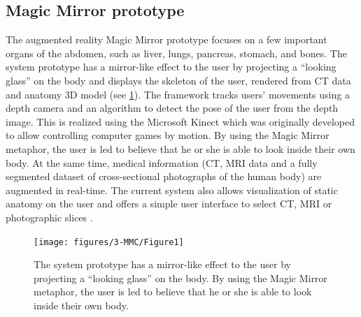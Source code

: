 \subsection{Magic Mirror prototype}
The augmented reality Magic Mirror prototype focuses on a few important organs of the abdomen, such as liver, lungs, pancreas, stomach, and bones.  
The system prototype has a mirror-like effect to the user by projecting a ``looking glass'' on the body and displays the skeleton of the user, rendered from CT data and anatomy 3D model (see \figurename{\ref{fig:3-MMC:Prototype}}). 
The framework tracks users' movements using a depth camera and an algorithm to detect the pose of the user from the depth image. This is realized using the Microsoft Kinect which was originally developed to allow controlling computer games by motion. 
By using the Magic Mirror metaphor, the user is led to believe that he or she is able to look inside their own body. At the same time, medical information (CT, MRI data and a fully segmented dataset of cross-sectional photographs of the human body) are augmented in real-time. The current system also allows visualization of static anatomy on the user and offers a simple user interface to select CT, MRI or photographic slices \cite{Blum2012,Navab2012a}.
\begin{figure}
	\centering
	\texttt{[image: figures/3-MMC/Figure1]}
	\caption[The Magic Mirror prototype.]{The system prototype has a mirror-like effect to the user by projecting a ``looking glass'' on the body. By using the Magic Mirror metaphor, the user is led to believe that he or she is able to look inside their own body.}
	\label{fig:3-MMC:Prototype}
\end{figure}

